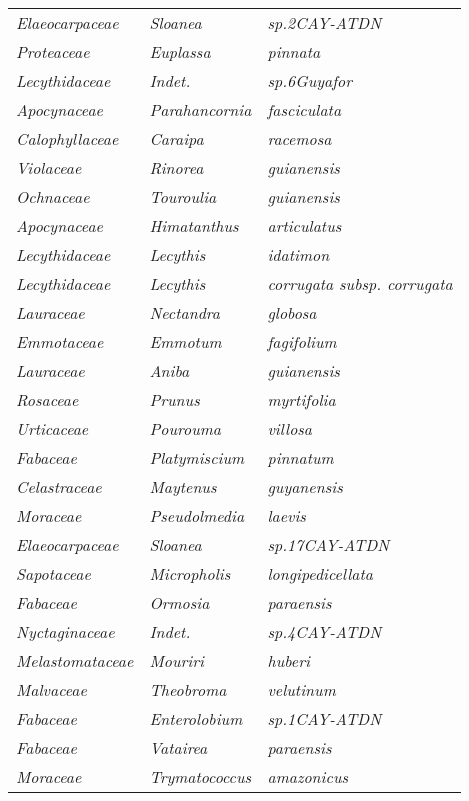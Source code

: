\documentclass[fleqn,10pt]{ArtEcoFoG} %
\renewenvironment{table}{\begin{table*}}{\end{table*}\ignorespacesafterend}
\begin{document}
\begin{table}
\begin{tabular}[t]{lll}
\addlinespace
\em{Elaeocarpaceae} & \em{Sloanea} & \em{sp.2CAY-ATDN}\\
\em{Proteaceae} & \em{Euplassa} & \em{pinnata}\\
\em{Lecythidaceae} & \em{Indet.} & \em{sp.6Guyafor}\\
\em{Apocynaceae} & \em{Parahancornia} & \em{fasciculata}\\
\em{Calophyllaceae} & \em{Caraipa} & \em{racemosa}\\
\addlinespace
\em{Violaceae} & \em{Rinorea} & \em{guianensis}\\
\em{Ochnaceae} & \em{Touroulia} & \em{guianensis}\\
\em{Apocynaceae} & \em{Himatanthus} & \em{articulatus}\\
\em{Lecythidaceae} & \em{Lecythis} & \em{idatimon}\\
\em{Lecythidaceae} & \em{Lecythis} & \em{corrugata subsp. corrugata}\\
\addlinespace
\em{Lauraceae} & \em{Nectandra} & \em{globosa}\\
\em{Emmotaceae} & \em{Emmotum} & \em{fagifolium}\\
\em{Lauraceae} & \em{Aniba} & \em{guianensis}\\
\em{Rosaceae} & \em{Prunus} & \em{myrtifolia}\\
\em{Urticaceae} & \em{Pourouma} & \em{villosa}\\
\addlinespace
\em{Fabaceae} & \em{Platymiscium} & \em{pinnatum}\\
\em{Celastraceae} & \em{Maytenus} & \em{guyanensis}\\
\em{Moraceae} & \em{Pseudolmedia} & \em{laevis}\\
\em{Elaeocarpaceae} & \em{Sloanea} & \em{sp.17CAY-ATDN}\\
\em{Sapotaceae} & \em{Micropholis} & \em{longipedicellata}\\
\addlinespace
\em{Fabaceae} & \em{Ormosia} & \em{paraensis}\\
\em{Nyctaginaceae} & \em{Indet.} & \em{sp.4CAY-ATDN}\\
\em{Melastomataceae} & \em{Mouriri} & \em{huberi}\\
\em{Malvaceae} & \em{Theobroma} & \em{velutinum}\\
\em{Fabaceae} & \em{Enterolobium} & \em{sp.1CAY-ATDN}\\
\addlinespace
\em{Fabaceae} & \em{Vatairea} & \em{paraensis}\\
\em{Moraceae} & \em{Trymatococcus} & \em{amazonicus}\\

\end{tabular}
\end{table}
\end{document}
